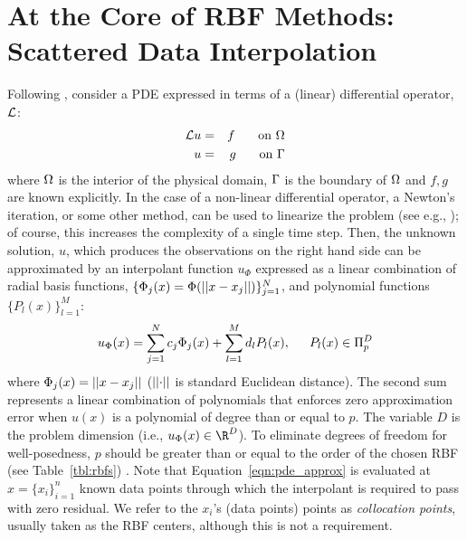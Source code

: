 \documentclass{report}
\begin{document}
{\section{At the Core of RBF Methods: Scattered Data Interpolation}
Following \cite{Mouat2002}, consider a PDE expressed in terms of a (linear) differential operator, $\diffop$: 
\begin{eqnarray}
\mathcal{L}u & = & f \hskip1.5em \textrm{ on } \Omega \\
u &=& g \hskip1.5em \textrm{ on } \Gamma
\end{eqnarray}
where $\Omega$ is the interior of the physical domain, $\Gamma$ is the boundary of $\Omega$ and $f,g$ are known explicitly. In the case of a non-linear differential operator, a Newton's iteration, or some other method, can be used to linearize the problem (see e.g., \cite{WrightFornberg06}); of course, this increases the complexity of a single time step. Then, the unknown solution, $u$, which produces the observations on the right hand side can be approximated by an interpolant function $u_{\Phi}$ expressed as a linear combination of radial basis functions, $\{\Phi_j(x) = \Phi(\left|\left|x-x_j\right|\right|)\}_{j=1}^{N}$, and polynomial functions$\{P_l(x)\}_{l=1}^{M}$:
\begin{equation}
	u_{\Phi}(x) = \sum_{j=1}^{N} c_{j}  \Phi_j(x) + \sum_{l=1}^{M} d_{l} P_l(x), \hskip1.5em P_l(x) \in \Pi^{D}_{p}
	\label{eqn:pde_approx}
\end{equation}
where $\Phi_j(x) = \left|\left|x - x_j\right|\right|$ ($\left|\left|\cdot\right|\right|$ is standard Euclidean distance). The 
second sum represents a linear combination of polynomials that enforces zero approximation error
 when $u(x)$ is a polynomial of degree than or equal to $p$. The variable $D$ is the 
 problem dimension (i.e., $u_{\Phi}(x) \in \R^{D}$). 
To eliminate degrees of freedom for well-posedness, $p$ should be greater than or equal to the order of the chosen RBF
 (see Table~\ref{tbl:rbfs}) \cite{Iske2004}.  
Note that Equation~\ref{eqn:pde_approx} is evaluated 
 at $x = \{x_i\}_{i=1}^{n}$ known 
data points through which the interpolant is required to pass with zero residual.  We refer to 
the $x_i$'s (data points) points as \emph{collocation points}, usually taken as the RBF centers, although this is not a requirement.

}
\end{document}
